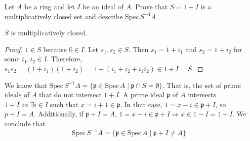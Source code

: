 \begin{problem}
Let $A$ be a ring and let $I$ be an ideal of $A$.
Prove that $S = 1 + I$ is a multiplicatively closed set and describe $\text{Spec}\,S^{-1}A$.
\begin{sol}
    \begin{claim}
        $S$ is multiplicatively closed.
        \begin{proof}
            $1 \in S$ because $0 \in I$.
            Let $s_1, s_2 \in S$.
            Then $s_1 = 1 + i_1$ and $s_2 = 1 + i_2$ for some $i_1, i_2 \in I$.
            Therefore, $s_1s_2 = (1 + i_1)(1 + i_2) = 1 + (i_1 + i_2 + i_1i_2) \in 1 + I = S$.
        \end{proof}
    \end{claim}
    \noindent We know that $\text{Spec}\,S^{-1}A = \{ \mathfrak{p} \in \text{Spec}\,A \mid \mathfrak{p} \cap S = \emptyset \}$.
    That is, the set of prime ideals of $A$ that do not intersect $1 + I$.
    A prime ideal $\mathfrak{p}$ of $A$  intersects $1 + I \iff \exists i \in I$ such that $x = i + 1 \in \mathfrak{p}$.
    In that case, $1 = x - i \in \mathfrak{p} + I$, so $p+I = A$.
    Additionally, if $\mathfrak{p}+I = A$, $1 = x + i \in \mathfrak{p}+I \Rightarrow x \in 1 - I = 1 + I$.
    We conclude that
    \[
        \text{Spec}\,S^{-1}A = \{ \mathfrak{p} \in \text{Spec}\,A \mid \mathfrak{p} + I \neq A \}
    \]



\end{sol}
\end{problem}